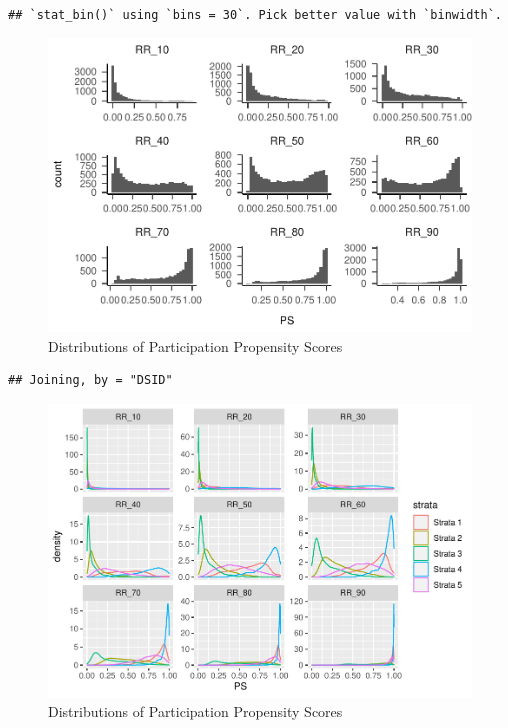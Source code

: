 \documentclass[
  english,
  man,floatsintext]{apa6}
\begin{document}
\begin{verbatim}
## `stat_bin()` using `bins = 30`. Pick better value with `binwidth`.
\end{verbatim}

\begin{figure}
\centering
\includegraphics{5---Analysis_files/figure-latex/unnamed-chunk-12-1.pdf}
\caption{\label{fig:unnamed-chunk-12-1}Distributions of Participation Propensity Scores}
\end{figure}

\begin{verbatim}
## Joining, by = "DSID"
\end{verbatim}

\begin{figure}
\centering
\includegraphics{5---Analysis_files/figure-latex/unnamed-chunk-12-2.pdf}
\caption{\label{fig:unnamed-chunk-12-2}Distributions of Participation Propensity Scores}
\end{figure}
\end{document}
